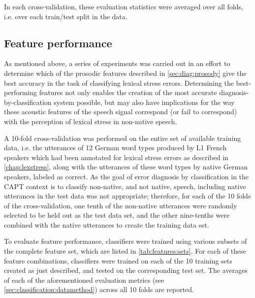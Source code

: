 	In each cross-validation, these evaluation statistics were averaged over all folds, i.e. over each train/test split in the data. 

		
	\subsection{Feature performance }
	\label{sec:classification:features}
	
		As mentioned above, a series of experiments was carried out in an effort to determine which of the prosodic features described in \cref{sec:diag:prosody} give the best accuracy in the task of classifying lexical stress errors. Determining the best-performing features not only enables the creation of the most accurate diagnosis-by-classification system possible, but may also have implications for the way these acoustic features of the speech signal correspond (or fail to correspond) with the perception of lexical stress in non-native speech. 
		
		A 10-fold cross-validation was performed on the entire set of available training data, i.e. the utterances of 12 German word types produced by L1 French speakers which had been annotated for lexical stress errors as described in \cref{chap:lexstress}, along with the	utterances of these word types by native German speakers, labeled as correct. As the goal of  error diagnosis by classification in the CAPT context is to classify non-native, and not native, speech, including native utterances in the test data was not appropriate; therefore, for each of the 10 folds of the cross-validation, one tenth of the non-native utterances were randomly selected to be held out as the test data set, and the other nine-tenths were combined with the native utterances to create the training data set. 
		
		To evaluate feature performance, classifiers were trained using various subsets of the complete feature set,
		which are listed in \cref{tab:features:sets}. For each of these feature combinations, classifiers were trained on each of the 10 training sets created as just described, and tested on the corresponding test set. The averages of each of the aforementioned evaluation metrics (see \cref{sec:classification:datamethod}) across all 10 folds are reported.

